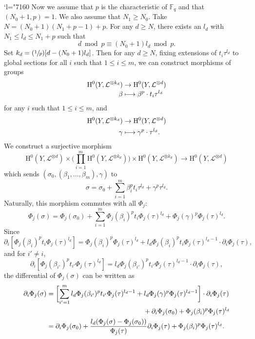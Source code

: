 \documentclass[JEP,XML,SOM,Unicode,published]{cedram}
\newcommand{\Changel}{\mathcode`l="7160}
\newcommand\mto{\mathchoice{\longmapsto}{\mapsto}{\mapsto}{\mapsto}}
\newcommand{\Psfrac}[2]{(\sfrac{#1}{#2})}
\theoremstyle{plain}
\theoremstyle{definition}
\newcommand{\ho}{\mathrm{H}}
\newcommand{\F}{\mathbb{F}}
\begin{document}
\Changel
Now we assume that $p$ is the characteristic of $\F_q$ and that $(N_0+1, p)=1$. We also assume that $N_1\geq N_0$. Take $N= (N_0+1)(N_1+p-1)+p$. For any $d\geq N$, there exists an $l_d$ with $N_1\leq l_d\leq N_1+p$ such that\vspace*{-3pt}
\[
d\bmod p \equiv (N_0+1)l_d\bmod p.
\]
Set $k_d=\Psfrac{1}{p}[d-(N_0+1)l_d]$. Then for any $d\geq N$, fixing extensions of $t_i\tau^{l_d}$ to global sections for all $i$ such that $1\leq i\leq m$, we can construct morphisms of groups\vspace*{-3pt}
\begin{align*}
\ho^0(Y, \mathcal{L}^{\otimes k_d}) & \to \ho^0(Y, \mathcal{L}^{\otimes d}) \\[-3pt]
\beta & \mto \beta^p\cdot t_i\tau^{l_d}
\end{align*}
for any $i$ such that $1\leq i\leq m$, and
\begin{align*}
\ho^0(Y, \mathcal{L}^{\otimes k_d}) & \to \ho^0(Y, \mathcal{L}^{\otimes d}) \\
\gamma & \mto \gamma^p\cdot \tau^{l_d}.
\end{align*}
We construct a surjective morphism
\[
\ho^0(Y,\mathcal{L}^{\otimes d})\times \biggl(\prod_{i=1}^m \ho^0(Y,\mathcal{L}^{\otimes k_d}) \biggr) \times \ho^0(Y, \mathcal{L}^{\otimes k_d}) \to \ho^0(Y, \mathcal{L}^{\otimes d})
\]
which sends $(\sigma_0, (\beta_1,\dots, \beta_m), \gamma)$ to
\[
\sigma=\sigma_0+\sum_{i=1}^m \beta_i^pt_i\tau^{l_d}+\gamma^p\tau^{l_d}.
\]
Naturally, this morphism commutes with all $\Phi_j$:
\[
\Phi_j(\sigma)=\Phi_j(\sigma_0)+\sum_{i=1}^m \Phi_j(\beta_i)^pt_i\Phi_j(\tau)^{l_d}+\Phi_j(\gamma)^p\Phi_j(\tau)^{l_d}.
\]
Since
\[
\partial_i[\Phi_j(\beta_i)^p t_i \Phi_j(\tau)^{l_d}]=\Phi_j(\beta_i)^p \Phi_j(\tau)^{l_d} + l_d \Phi_j(\beta_i)^pt_i\Phi_j(\tau)^{l_d-1}\cdot \partial_i \Phi_j(\tau),
\]
and for $i'\not=i$,
\[
\partial_i[\Phi_j(\beta_{i'})^p t_{i'} \Phi_j(\tau)^{l_d}]=l_d \Phi_j(\beta_{i'})^p t_{i'}\Phi_j(\tau)^{l_d-1}\cdot \partial_i \Phi_j(\tau),
\]
the differential of $\Phi_j(\sigma)$ can be written as
\begin{align*}
\partial_i\Phi_j(\sigma) &= \biggl[ \sum_{i'=1}^m l_d\Phi_j(\beta_{i'})^p t_{i'}\Phi_j(\tau)^{l_d-1}+l_d \Phi_j(\gamma)^p\Phi_j(\tau)^{l_d-1} \biggr]\cdot \partial_i \Phi_j(\tau)\\
& \hspace*{5cm}+\partial_i\Phi_j(\sigma_0)+\Phi_j(\beta_i)^p\Phi_j(\tau)^{l_d} \\
&= \partial_i\Phi_j(\sigma_0)+ \frac{l_d(\Phi_j(\sigma)-\Phi_j(\sigma_0))}{\Phi_j(\tau)}\partial_i\Phi_j(\tau)+ \Phi_j(\beta_i)^p \Phi_j(\tau)^{l_d}.
\end{align*}
\end{document}

